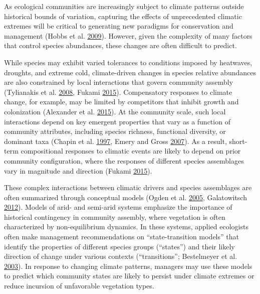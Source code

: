 \documentclass[twoside,12pt,final]{ucthesis-CA2012}
\begin{document}
\begin{ucmainmatter}
As ecological communities are increasingly subject to climate patterns outside historical bounds of variation, capturing the effects of unprecedented climatic extremes will be critical to generating new paradigms for conservation and management (Hobbs et al. \protect\hyperlink{ref-Hobbs2009}{2009}).
However, given the complexity of many factors that control species abundances, these changes are often difficult to predict.

While species may exhibit varied tolerances to conditions imposed by heatwaves, droughts, and extreme cold, climate-driven changes in species relative abundances are also constrained by local interactions that govern community assembly (Tylianakis et al. \protect\hyperlink{ref-Tylianakis2008}{2008}, Fukami \protect\hyperlink{ref-Fukami2015}{2015}).
Compensatory responses to climate change, for example, may be limited by competitors that inhibit growth and colonization (Alexander et al. \protect\hyperlink{ref-Alexander2015}{2015}).
At the community scale, such local interactions depend on key emergent properties that vary as a function of community attributes, including species richness, functional diversity, or dominant taxa (Chapin et al. \protect\hyperlink{ref-Chapin1997}{1997}, Emery and Gross \protect\hyperlink{ref-Emery2007}{2007}).
As a result, short-term compositional responses to climatic events are likely to depend on prior community configuration, where the responses of different species assemblages vary in magnitude and direction (Fukami \protect\hyperlink{ref-Fukami2015}{2015}).

These complex interactions between climatic drivers and species assemblages are often summarized through conceptual models (Ogden et al. \protect\hyperlink{ref-Ogden2005}{2005}, Galatowitsch \protect\hyperlink{ref-Galatowitsch2012}{2012}).
Models of arid- and semi-arid systems emphasize the importance of historical contingency in community assembly, where vegetation is often characterized by non-equilibrium dynamics.
In these systems, applied ecologists often make management recommendations on ``state-transition models'' that identify the properties of different species groups (``states'') and their likely direction of change under various contexts (``transitions''; Bestelmeyer et al. \protect\hyperlink{ref-Bestelmeyer2003}{2003}).
In response to changing climate patterns, managers may use these models to predict which community states are likely to persist under climate extremes or reduce incursion of unfavorable vegetation types.


\end{ucmainmatter}
\end{document}
